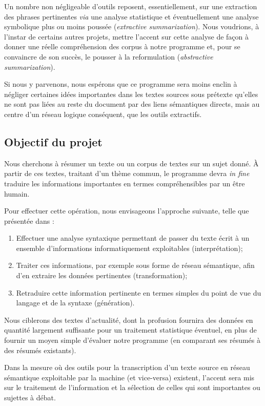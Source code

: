 \documentclass{article}           %
\begin{document}
Un nombre non négligeable d'outils reposent, essentiellement, sur une extraction des phrases pertinentes \textit{via} une analyse statistique et éventuellement une analyse symbolique plus ou moins poussée (\textit{extractive summarization}). Nous voudrions, à l'instar de certains autres projets, mettre l'accent sur cette analyse de façon à donner une réelle compréhension des corpus à notre programme et, pour se convaincre de son succès, le pousser à la reformulation (\textit{abstractive summarization}).

Si nous y parvenons, nous espérons que ce programme sera moins enclin à négliger certaines idées importantes dans les textes sources sous prétexte qu'elles ne sont pas liées au reste du document par des liens sémantiques directs, mais au centre d'un réseau logique conséquent, que les outils extractifs.

\subsection{Objectif du projet}
Nous cherchons à résumer un texte ou un corpus de textes sur un sujet donné. \`{A} partir de ces textes, traitant d'un thème commun, le programme devra \textit{in fine} traduire les informations importantes en termes compréhensibles par un être humain.


Pour effectuer cette opération, nous envisageons l'approche suivante, telle que présentée dans \cite{jones_automatic_2007} :

\begin{enumerate}
 \item Effectuer une analyse syntaxique permettant de passer du texte écrit à un ensemble d'informations informatiquement exploitables (interprétation);
 \item Traiter ces informations, par exemple sous forme de réseau sémantique, afin d'en extraire les données pertinentes (transformation);
 \item Retraduire cette information pertinente en termes simples du point de vue du langage et de la syntaxe (génération).
\end{enumerate}


Nous ciblerons des textes d'actualité, dont la profusion fournira des données en quantité largement suffisante pour un traitement statistique éventuel, en plus de fournir un moyen simple d'évaluer notre programme (en comparant ses résumés à des résumés existants).

Dans la mesure où des outils pour la transcription d'un texte source en réseau sémantique exploitable par la machine (et vice-versa) existent, l'accent sera mis sur le traitement de l'information et la sélection de celles qui sont importantes ou sujettes à débat.
\end{document}
